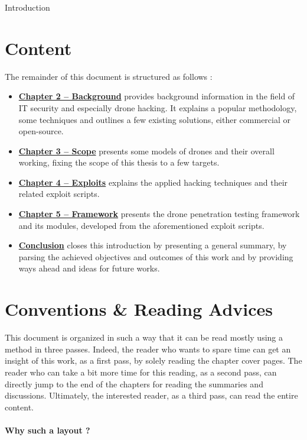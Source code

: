 \begin{chaptercover}{Introduction}
\section{Content}
The remainder of this document is structured as follows :
\begin{itemize}[itemsep=0.1cm,topsep=0.1cm]
  \item \hyperref[background]{\color{FirstBlue}\bfseries Chapter 2 -- Background} provides background information in the field of IT security and especially drone hacking. It explains a popular methodology, some techniques and outlines a few existing solutions, either commercial or open-source.
  \item \hyperref[scope]{\color{FirstBlue}\bfseries Chapter 3 -- Scope} presents some models of drones and their overall working, fixing the scope of this thesis to a few targets.
  \item \hyperref[exploits]{\color{FirstBlue}\bfseries Chapter 4 -- Exploits} explains the applied hacking techniques and their related exploit scripts.
  \item \hyperref[framework]{\color{FirstBlue}\bfseries Chapter 5 -- Framework} presents the drone penetration testing framework and its modules, developed from the aforementioned exploit scripts.
  \item \hyperref[conclusion]{\color{FirstBlue}\bfseries Conclusion} closes this introduction by presenting a general summary, by parsing the achieved objectives and outcomes of this work and by providing ways ahead and ideas for future works.
\end{itemize}


\section{Conventions \& Reading Advices}
This document is organized in such a way that it can be read mostly using a method in three passes. Indeed, the reader who wants to spare time can get an insight of this work, as a first pass, by solely reading the chapter cover pages. The reader who can take a bit more time for this reading, as a second pass, can directly jump to the end of the chapters for reading the summaries and discussions. Ultimately, the interested reader, as a third pass, can read the entire content.

\begin{tip}
\vspace{-.5cm}
\paragraph{Why such a layout ?}\hfill


\end{tip}
\end{chaptercover}

